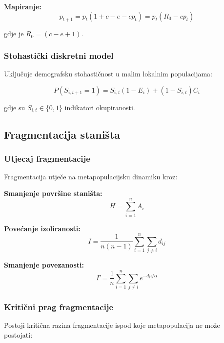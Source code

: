 \documentclass[11pt,oneside]{book}
\begin{document}
\textbf{Mapiranje:}
\begin{equation}
	p_{t+1} = p_t(1 + c - e - cp_t) = p_t(R_0 - cp_t)
\end{equation}

gdje je $R_0 = (c-e+1)$.

\subsubsection{Stohastički diskretni model}

Uključuje demografsku stohastičnost u malim lokalnim populacijama:

\begin{equation}
	P(S_{i,t+1} = 1) = S_{i,t}(1-E_i) + (1-S_{i,t})C_i
\end{equation}

gdje su $S_{i,t} \in \{0,1\}$ indikatori okupiranosti.

\subsection{Fragmentacija staništa}

\subsubsection{Utjecaj fragmentacije}

Fragmentacija utječe na metapopulacijsku dinamiku kroz:

\textbf{Smanjenje površine staništa:}
\begin{equation}
	H = \sum_{i=1}^{n} A_i
\end{equation}

\textbf{Povećanje izoliranosti:}
\begin{equation}
	I = \frac{1}{n(n-1)} \sum_{i=1}^{n} \sum_{j \neq i} d_{ij}
\end{equation}

\textbf{Smanjenje povezanosti:}
\begin{equation}
	\Gamma = \frac{1}{n} \sum_{i=1}^{n} \sum_{j \neq i} e^{-d_{ij}/\alpha}
\end{equation}

\subsubsection{Kritični prag fragmentacije}

Postoji kritična razina fragmentacije ispod koje metapopulacija ne može postojati:
\end{document}
